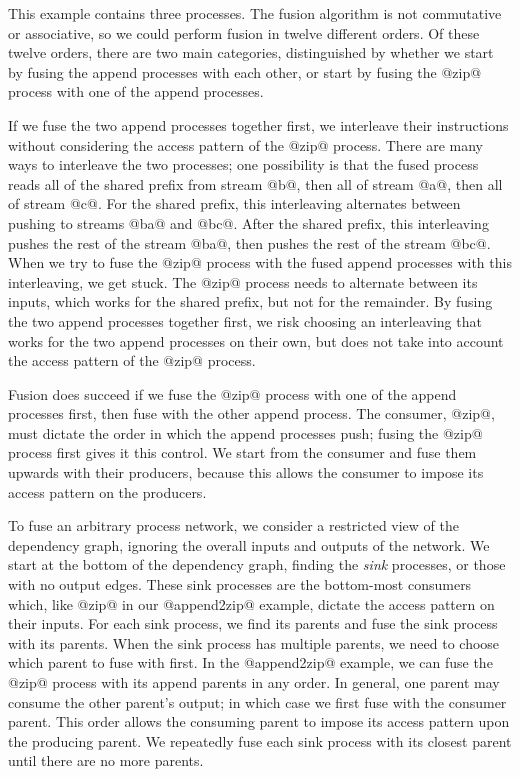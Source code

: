 This example contains three processes.
The fusion algorithm is not commutative or associative, so we could perform fusion in twelve different orders.
Of these twelve orders, there are two main categories, distinguished by whether we start by fusing the append processes with each other, or start by fusing the @zip@ process with one of the append processes.

If we fuse the two append processes together first, we interleave their instructions without considering the access pattern of the @zip@ process.
There are many ways to interleave the two processes; one possibility is that the fused process reads all of the shared prefix from stream @b@, then all of stream @a@, then all of stream @c@.
For the shared prefix, this interleaving alternates between pushing to streams @ba@ and @bc@.
After the shared prefix, this interleaving pushes the rest of the stream @ba@, then pushes the rest of the stream @bc@.
When we try to fuse the @zip@ process with the fused append processes with this interleaving, we get stuck.
The @zip@ process needs to alternate between its inputs, which works for the shared prefix, but not for the remainder.
By fusing the two append processes together first, we risk choosing an interleaving that works for the two append processes on their own, but does not take into account the access pattern of the @zip@ process.

Fusion does succeed if we fuse the @zip@ process with one of the append processes first, then fuse with the other append process.
The consumer, @zip@, must dictate the order in which the append processes push; fusing the @zip@ process first gives it this control.
We start from the consumer and fuse them upwards with their producers, because this allows the consumer to impose its access pattern on the producers.

To fuse an arbitrary process network, we consider a restricted view of the dependency graph, ignoring the overall inputs and outputs of the network.
We start at the bottom of the dependency graph, finding the \emph{sink} processes, or those with no output edges.
These sink processes are the bottom-most consumers which, like @zip@ in our @append2zip@ example, dictate the access pattern on their inputs.
For each sink process, we find its parents and fuse the sink process with its parents.
When the sink process has multiple parents, we need to choose which parent to fuse with first.
In the @append2zip@ example, we can fuse the @zip@ process with its append parents in any order.
In general, one parent may consume the other parent's output; in which case we first fuse with the consumer parent.
This order allows the consuming parent to impose its access pattern upon the producing parent.
We repeatedly fuse each sink process with its closest parent until there are no more parents.

